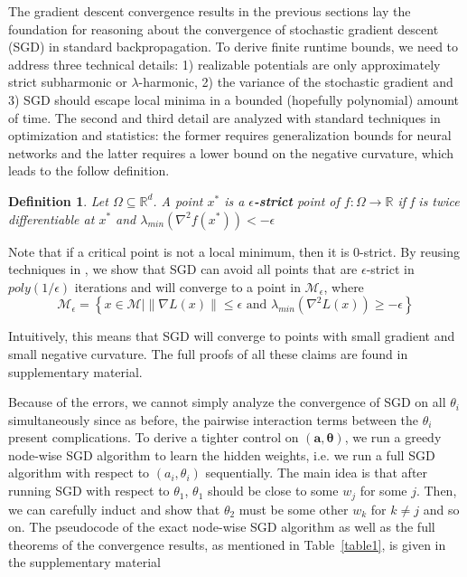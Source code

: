 \documentclass{article}
\newtheorem{definition}[theorem]{Definition}
\newcommand{\R}{{\mathbb{R}}}
\begin{document}
The gradient descent convergence results in the previous sections lay the foundation for reasoning about the convergence of stochastic gradient descent (SGD) in standard backpropagation. To derive finite runtime bounds, we need to address three technical details: 1) realizable potentials are only approximately strict subharmonic or $\lambda$-harmonic, 2) the variance of the stochastic gradient and 3) SGD should escape local minima in a bounded (hopefully polynomial) amount of time. The second and third detail are analyzed with standard techniques in optimization and statistics: the former requires generalization bounds for neural networks and the latter requires a lower bound on the negative curvature, which leads to the follow definition.

\begin{definition} Let $\Omega \subseteq \R^d$. A point $x^*$ is a {\bf $\epsilon$-strict} point of $f : \Omega \to \R$ if f is twice differentiable at $x^*$ and $\lambda_{min}(\nabla^2f(x^*)) < -\epsilon$
\end{definition}

Note that if a critical point is not a local minimum, then it is
$0$-strict. By reusing techniques in \cite{GeHJY15}, we show that SGD can avoid all points that are $\epsilon$-strict in $poly(1/\epsilon)$ iterations and will converge
to a point in $\mathcal{M}_\epsilon$, where 
%
\[\mathcal{M}_\epsilon = \left\{x\in \mathcal{M} \Big| \|\nabla L(x)\| \leq \epsilon \text{ and } \lambda_{min}(\nabla^2 L(x)) \geq -\epsilon\right\}\]

Intuitively, this means that SGD will converge to points with small gradient and small negative curvature. The full proofs of all these claims are found in supplementary material. 

Because of the errors, we cannot simply analyze the convergence of SGD on all $\theta_i$ simultaneously since as before, the pairwise interaction terms between the $\theta_i$ present complications. To derive a tighter control on $(\boldsymbol{a,\theta})$, we run a greedy node-wise SGD algorithm to learn the hidden weights, i.e. we run a full SGD algorithm with respect to $(a_i,\theta_i)$ sequentially. The main idea is that after running SGD with respect to $\theta_1$, $\theta_1$ should be close to some $w_j$ for some $j$. Then, we can carefully induct and show that $\theta_2$ must be some other $w_k$ for $k\neq j$ and so on. The pseudocode of the exact node-wise SGD algorithm as well as the full theorems of the convergence results, as mentioned in Table~\ref{table1}, is given in the supplementary material
\end{document}
